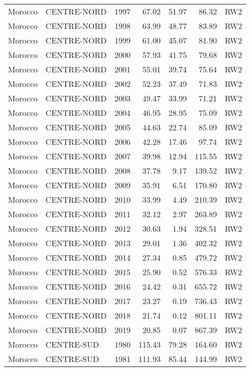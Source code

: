 \begin{longtable}{lllrrrl}
  Morocco & CENTRE-NORD & 1997 & 67.02 & 51.97 & 86.32 & RW2 \\ 
  Morocco & CENTRE-NORD & 1998 & 63.99 & 48.77 & 83.89 & RW2 \\ 
  Morocco & CENTRE-NORD & 1999 & 61.00 & 45.07 & 81.90 & RW2 \\ 
  Morocco & CENTRE-NORD & 2000 & 57.93 & 41.75 & 79.68 & RW2 \\ 
  Morocco & CENTRE-NORD & 2001 & 55.01 & 39.74 & 75.64 & RW2 \\ 
  Morocco & CENTRE-NORD & 2002 & 52.23 & 37.49 & 71.83 & RW2 \\ 
  Morocco & CENTRE-NORD & 2003 & 49.47 & 33.99 & 71.21 & RW2 \\ 
  Morocco & CENTRE-NORD & 2004 & 46.95 & 28.95 & 75.09 & RW2 \\ 
  Morocco & CENTRE-NORD & 2005 & 44.63 & 22.74 & 85.09 & RW2 \\ 
  Morocco & CENTRE-NORD & 2006 & 42.28 & 17.46 & 97.74 & RW2 \\ 
  Morocco & CENTRE-NORD & 2007 & 39.98 & 12.94 & 115.55 & RW2 \\ 
  Morocco & CENTRE-NORD & 2008 & 37.78 & 9.17 & 139.52 & RW2 \\ 
  Morocco & CENTRE-NORD & 2009 & 35.91 & 6.51 & 170.80 & RW2 \\ 
  Morocco & CENTRE-NORD & 2010 & 33.99 & 4.49 & 210.39 & RW2 \\ 
  Morocco & CENTRE-NORD & 2011 & 32.12 & 2.97 & 263.89 & RW2 \\ 
  Morocco & CENTRE-NORD & 2012 & 30.63 & 1.94 & 328.51 & RW2 \\ 
  Morocco & CENTRE-NORD & 2013 & 29.01 & 1.36 & 402.32 & RW2 \\ 
  Morocco & CENTRE-NORD & 2014 & 27.34 & 0.85 & 479.72 & RW2 \\ 
  Morocco & CENTRE-NORD & 2015 & 25.90 & 0.52 & 576.33 & RW2 \\ 
  Morocco & CENTRE-NORD & 2016 & 24.42 & 0.31 & 655.72 & RW2 \\ 
  Morocco & CENTRE-NORD & 2017 & 23.27 & 0.19 & 736.43 & RW2 \\ 
  Morocco & CENTRE-NORD & 2018 & 21.74 & 0.12 & 801.11 & RW2 \\ 
  Morocco & CENTRE-NORD & 2019 & 20.85 & 0.07 & 867.39 & RW2 \\ 
  Morocco & CENTRE-SUD & 1980 & 115.43 & 79.28 & 164.60 & RW2 \\ 
  Morocco & CENTRE-SUD & 1981 & 111.93 & 85.44 & 144.99 & RW2 \\ 

\end{longtable}
